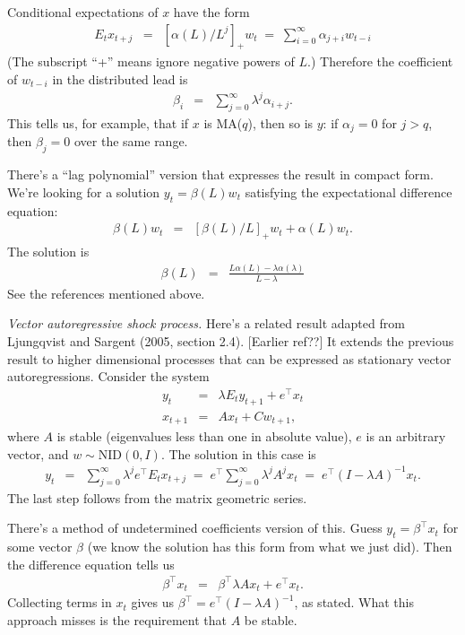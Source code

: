 \documentclass[11pt]{article}
\newcounter{tab}
\begin{document}
{Conditional expectations of $x$ have the form
\begin{eqnarray*}
    E_t x_{t+j}  &=&  [\alpha(L)/L^j]_+ w_t
                 \;=\;  \sum_{i=0}^\infty \alpha_{j+i} w_{t-i}
\end{eqnarray*}
(The subscript ``+'' means ignore negative powers of $L$.)
Therefore the coefficient of $ w_{t-i}$ in the distributed lead is
\begin{eqnarray*}
    \beta_i &=& \sum_{j=0}^\infty \lambda^j \alpha_{i+j} .
\end{eqnarray*}
This tells us, for example, that if $x$ is MA($q$), then so is $y$:
if $ \alpha_{j} = 0$ for $ j > q $,
then $ \beta_j = 0 $ over the same range.

There's a ``lag polynomial'' version that expresses the result in
compact form.
We're looking for a solution $y_t = \beta(L) w_t$ satisfying the
expectational difference equation:
\begin{eqnarray*}
    \beta(L) w_t &=& [\beta(L)/L]_+ w_t + \alpha(L) w_t  .
\end{eqnarray*}
The solution is
\begin{eqnarray*}
    \beta(L) &=&  \frac{L\alpha(L) - \lambda \alpha(\lambda)}{L-\lambda}
\end{eqnarray*}
See the references mentioned above.

{\it Vector autoregressive shock process.\/}
Here's a related result adapted from
Ljungqvist and Sargent (2005, section 2.4).  [Earlier ref??]
It extends the previous result to higher dimensional processes
that can be expressed as stationary vector autoregressions.
Consider the system
\begin{eqnarray*}
    y_t &=&    \lambda E_t y_{t+1} + e^\top x_{t}  \\
    x_{t+1}  &=&  A x_t + C w_{t+1} ,
\end{eqnarray*}
where
$A$ is stable (eigenvalues less than one in absolute value),
$e$ is an arbitrary vector,
and  $w \sim \mbox{NID}(0,I)$.
The solution in this case is
\begin{eqnarray*}
    y_t &=&  \sum_{j=0}^\infty \lambda^j  e^\top E_t x_{t+j}
        \;=\;  e^\top \sum_{j=0}^\infty \lambda^j  A^j x_{t}
        \;=\;  e^\top (I-\lambda A)^{-1} x_t.
\end{eqnarray*}
The last step follows from the matrix geometric series.

There's a method of undetermined coefficients version of this.
Guess $ y_t = \beta^\top x_t$ for some vector $\beta$
(we know the solution has this form from what we just did).
Then the difference equation tells us
\begin{eqnarray*}
    \beta^\top x_t &=&  \beta^\top \lambda A x_t + e^\top x_t .
\end{eqnarray*}
Collecting terms in $x_t$ gives us
$ \beta^\top =  e^\top (I-\lambda A)^{-1} $, as stated.
What this approach misses is the requirement that $A$ be stable.



}
\end{document}
